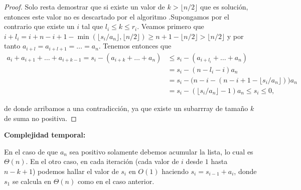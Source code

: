 \documentclass[10pt]{amsart}
\theoremstyle{definition}
\numberwithin{equation}{section}
\begin{document}
\begin{proof}
		Solo resta demostrar que si existe un valor de $k > \lfloor n/2 \rfloor$ que es soluci\'on, entonces este valor no es descartado por el algoritmo .Supongamos por el contrario que existe un $i$ tal que $l_i \le k \le r_i$. Veamos primero  que $i + l_i = i + n - i  + 1 - \min( \lfloor s_i/a_n \rfloor, \lfloor n/2 \rfloor) \ge n + 1 - \lfloor n/2 \rfloor > \lfloor n/2 \rfloor$ y por tanto $a_{i + l} = a_{i + l + 1} = \dots = a_n$.  Tenemos entonces que
		 \begin{align*}
		 a_i + a_{i + 1} + \dots + a_{ i + k - 1} =  s_i - (a_{i + k} + \dots + a_n) 
		 &\le s_i - (a_{i + l_i} + \dots + a_n) 
		 \\& = s_i - (n - l_i - i )a_n 
		 \\ & = s_i - \big (n - i - (n - i + 1 - \lfloor s_i / a_n \rfloor) \big)a_n
		 \\ & = s_i - (\lfloor s_i / a_n \rfloor - 1) a_n 
		   \le s_i 
		 \le 0, 
		 \end{align*}
	 
	de donde arribamos a una contradicci\'on, ya que existe un subarrray de tama\~no $k$ de suma no positiva.
 		
 		
 		
 		
 	\end{proof}
 		
		 \textbf{Complejidad temporal:}
		 
		 En el caso de que $a_n$ sea positivo solamente debemos acumular la lista, lo cual es $\Theta(n)$. En el otro caso, en cada iteraci\'on (cada valor de $i$ desde $1$ hasta $n - k + 1$) podemos hallar el valor de $s_i$ en $O(1)$ haciendo $s_{i} = s_{i - 1} + a_i$, donde $s_1$ se calcula en $\Theta(n)$ como en el caso anterior. 
		 
\end{document}
